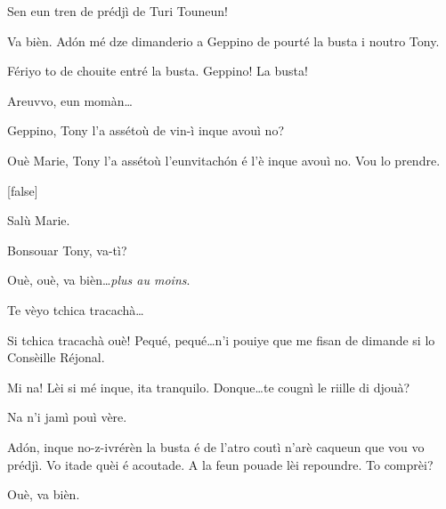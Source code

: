 \begin{drama}
\Twitterspeaks{} Sen eun tren de prédjì de Turi Touneun!

\Mariespeaks Va bièn. Ad\'on mé dze dimanderio a Geppino de pourté la busta i noutro Tony.




\Mariespeaks Fériyo to de chouite entré la busta.  Geppino! La busta!

\Geppinospeaks Areuvvo, eun momàn\ldots


\Mariespeaks Geppino, Tony l’a assétoù de vin-ì inque avouì no?

\Geppinospeaks Ouè Marie, Tony l’a assétoù l'eunvitach\'on é l’è inque avouì no. Vou lo prendre.

[false]%


\Turispeaks Salù Marie.

\Mariespeaks Bonsouar Tony, va-tì?

\Turispeaks{} Ouè, ouè, va bièn\ldots \textit{plus au moins}. 

\Mariespeaks Te vèyo tchica tracachà\ldots

\Turispeaks Si tchica tracachà ouè! Pequé, pequé\ldots n’i pouiye que me fisan de dimande si lo Consèille Réjonal.

\Mariespeaks Mi na! Lèi si mé inque, ita tranquilo. Donque\ldots te cougnì le riille di djouà?

\Turispeaks Na n'i jamì pouì vère.

\Mariespeaks Ad\'on, inque  no-z-ivrérèn  la busta é de l'atro coutì n'arè caqueun que vou vo prédjì. Vo itade quèi é acoutade. A la feun pouade lèi repoundre. To comprèi?

\Turispeaks Ouè, va bièn.


\end{drama}

